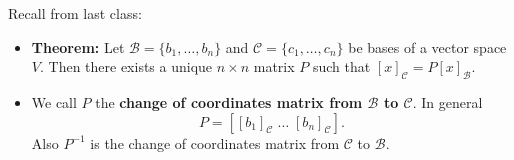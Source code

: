 \documentclass[12pt,letterpaper]{article}
\begin{document}
\thispagestyle{fancy}


Recall from last class:

\begin{itemize}
\item {\bf Theorem:} Let $\mathcal{B}=\{b_1, \dots, b_n\}$ and $\mathcal{C}=\{c_1, \dots, c_n\}$ be bases of a vector space $V$. Then there exists a unique $n\times n$ matrix $P$ such that $[x]_{\mathcal{C}}=P [x]_{\mathcal{B}}$.
\item We call $P$ the {\bf change of coordinates matrix from $\mathcal{B}$ to $\mathcal{C}$}. In general $$P= [[b_1]_\mathcal{C} \; \dots \; [b_n]_\mathcal{C}].$$ Also $P^{-1}$ is the change of coordinates matrix from $\mathcal{C}$ to $\mathcal{B}$.

\end{itemize}



\newpage
\end{document}
